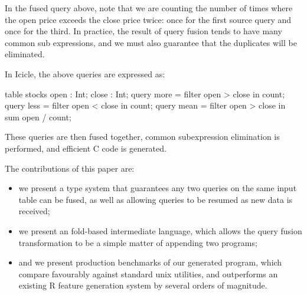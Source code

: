 In the fused query above, note that we are counting the number of times where the open price exceeds the close price twice: once for the first source query and once for the third. In practice, the result of query fusion tends to have many common sub expressions, and we must also guarantee that the duplicates will be eliminated.



In Icicle, the above queries are expressed as:
\begin{code}
table stocks { open : Int; close : Int; }
query more = filter open > close in count;
query less = filter open < close in count;
query mean = filter open > close in sum open / count;
\end{code}

These queries are then fused together, common subexpression elimination is performed, and efficient C code is generated.

The contributions of this paper are:
\begin{itemize}
\item
we present a type system that guarantees any two queries on the same input table can be fused, as well as allowing queries to be resumed as new data is received;

\item
we present an fold-based intermediate language, which allows the query fusion transformation to be a simple matter of appending two programs;

\item
and we present production benchmarks of our generated program, which compare favourably against standard unix utilities, and outperforms an existing R feature generation system by several orders of magnitude.
\end{itemize}
